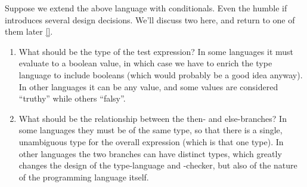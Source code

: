 
Suppose we extend the above language with conditionals. Even the humble if
introduces several design decisions. We’ll discuss two here, and return to one
of them later \ref{}.
\begin{enumerate}
  \item 
What should be the type of the test expression? In some languages it must
evaluate to a boolean value, in which case we have to enrich the type language
to include booleans (which would probably be a good idea anyway). In other
languages it can be any value, and some values are considered “truthy” while
others “falsy”.
  \item 
What should be the relationship between the then- and else-branches? In some
languages they must be of the same type, so that there is a single, unambiguous
type for the overall expression (which is that one type). In other languages the
two branches can have distinct types, which greatly changes the design of the
type-language and -checker, but also of the nature of the programming language
itself.
\end{enumerate}


